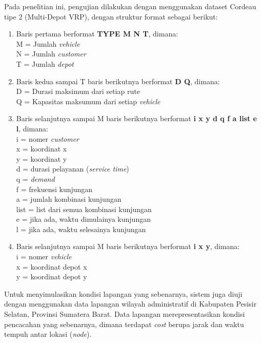 Pada penelitian ini, pengujian dilakukan dengan menggunakan dataset Cordeau tipe 2 (Multi-Depot VRP), dengan struktur format sebagai berikut:
\begin{enumerate}
\item Baris pertama berformat \textbf{TYPE M N T}, dimana: \\
M = Jumlah \textit{vehicle} \\
N = Jumlah \textit{customer} \\
T = Jumlah \textit{depot}

\item Baris kedua sampai T baris berikutnya berformat \textbf{D Q}, dimana: \\
D = Durasi maksimum dari setiap rute \\
Q = Kapasitas maksumum dari setiap \textit{vehicle}

\item Baris selanjutnya sampai M baris berikutnya berformat \textbf{i x y d q f a list e l}, dimana: \\
i	= nomer \textit{customer} \\
x	= koordinat x \\
y	= koordinat y \\
d	= durasi pelayanan (\textit{service time}) \\
q	= \textit{demand} \\
f	= frekuensi kunjungan \\
a	= jumlah kombinasi kunjungan \\
list	= list dari semua kombinasi kunjungan \\
e	= jika ada, waktu dimulainya kunjungan \\
l	= jika ada, waktu selesainya kunjungan

\item Baris selanjutnya sampai M baris berikutnya berformat \textbf{i x y}, dimana: \\
i	= nomer \textit{vehicle} \\
x	= koordinat depot x \\
y	= koordinat depot y \\
\end{enumerate}

Untuk menyimulasikan kondisi lapangan yang sebenarnya, sistem juga diuji dengan menggunakan data lapangan wilayah administratif di Kabupaten Pesisir Selatan, Provinsi Sumatera Barat. Data lapangan merepresentasikan kondisi pencacahan yang sebenarnya, dimana terdapat \textit{cost} berupa jarak dan waktu tempuh antar lokasi (\textit{node}). 

